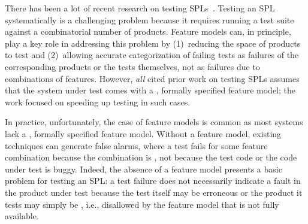
There has been a lot of recent research on testing
SPLs~\cite{kim-etal-fse2013, dagstuhl-seminar-spl-analysis-2013,
apel-icse2013, shi-etal-fase2012, charles-etal-icse2012,
kim-etal-issre2012, hwan-aosd-2011, Garvin-issre2011,
DBLP:conf/splc/CabralCR10}.
Testing an SPL systematically is a
challenging problem because it requires running a test suite against a
combinatorial number of products.  Feature models can, in principle,
play a key role in addressing this problem by (1)~reducing the space
of products to test and (2)~allowing accurate categorization of
failing tests as failures of the corresponding products or the tests
themselves, not as failures due to \inconsistent{} combinations of features.
However, \emph{all} cited prior work on testing SPLs assumes that the
system under test comes with a \complete{}, formally specified feature
model; the work focused on speeding up testing in such cases.

In practice, unfortunately, the case of \incomplete{} feature models
is common as most systems lack a \complete, formally specified feature
model.  Without a \complete{} feature model, existing techniques can
generate false alarms, where a test fails for some feature combination
because the combination is \inconsistent{}, not because the test code or the
code under test is buggy.  Indeed, the absence of a \complete{}
feature model presents a basic problem for testing an SPL: a test
failure does not necessarily indicate a fault in the product under
test because the test itself may be erroneous or the product it tests
may simply be \inconsistent{}, i.e., disallowed by the feature model that is
not fully available.

